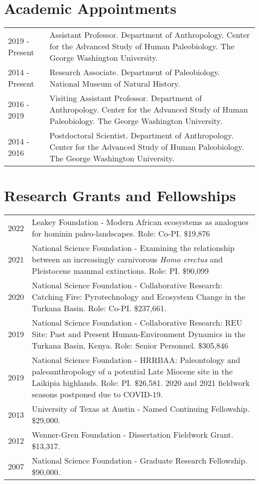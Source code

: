 \documentclass{article}
\begin{document}
\section*{Academic Appointments}
\begin{tabular}{p{}p{}}
2019 - Present & Assistant Professor. Department of Anthropology. Center for the Advanced Study of Human Paleobiology. The George Washington University.\\[4pt]
2014 - Present & Research Associate. Department of Paleobiology.  National Museum of Natural History.\\[4pt]
2016 - 2019 & Visiting Assistant Professor. Department of Anthropology. Center for the Advanced Study of Human Paleobiology. The George Washington University.\\[4pt]
2014 - 2016 & Postdoctoral Scientist. Department of Anthropology. Center for the Advanced Study of Human Paleobiology. The George Washington University. \\[4pt]
\end{tabular} 


\section*{Research Grants and Fellowships}
\begin{tabular}{p{}p{}}
2022 & Leakey Foundation - Modern African ecosystems as analogues for hominin paleo-landscapes. Role: Co-PI. \$19,876\\[4pt]
2021 & National Science Foundation - Examining the relationship between an increasingly carnivorous \emph{Homo erectus} and Pleistocene mammal extinctions. Role: PI. \$90,099\\[4pt]
2020 & National Science Foundation - Collaborative Research: Catching Fire: Pyrotechnology and Ecosystem Change in the Turkana Basin. Role: Co-PI. \$237,661.\\[4pt]
2019 &  National Science Foundation - Collaborative Research: REU Site: Past and Present Human-Environment Dynamics in the Turkana Basin, Kenya. Role: Senior Personnel. \$305,846\\[4pt]
2019 & National Science Foundation - HRRBAA: Paleontology and paleoanthropology of a potential Late Miocene site in the Laikipia highlands. Role: PI. \$26,581. 2020 and 2021 fieldwork seasons postponed due to COVID-19. \\[4pt]
2013 &  University of Texas at Austin - Named Continuing Fellowship. \$29,000.\\[4pt]
2012  & Wenner-Gren Foundation - Dissertation Fieldwork Grant. \$13,317.\\[4pt]
2007 &  National Science Foundation - Graduate Research Fellowship. \$90,000.\\[4pt]

\end{tabular}
\end{document}
